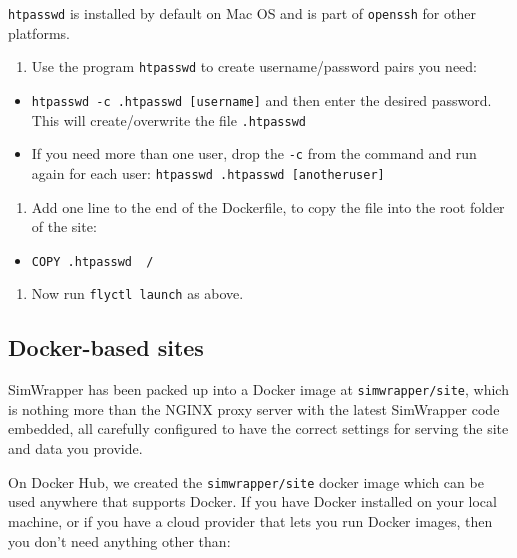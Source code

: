 \texttt{htpasswd} is installed by default on Mac OS and is part of
\texttt{openssh} for other platforms.

\begin{enumerate}
\def\labelenumi{\arabic{enumi}.}
\tightlist
\item
  Use the program \texttt{htpasswd} to create username/password pairs
  you need:
\end{enumerate}

\begin{itemize}
\tightlist
\item
  \texttt{htpasswd\ -c\ .htpasswd\ {[}username{]}} and then enter the
  desired password. This will create/overwrite the file
  \texttt{.htpasswd}
\item
  If you need more than one user, drop the \texttt{-c} from the command
  and run again for each user:
  \texttt{htpasswd\ .htpasswd\ {[}anotheruser{]}}
\end{itemize}

\begin{enumerate}
\def\labelenumi{\arabic{enumi}.}
\setcounter{enumi}{1}
\tightlist
\item
  Add one line to the end of the Dockerfile, to copy the file into the
  root folder of the site:
\end{enumerate}

\begin{itemize}
\tightlist
\item
  \texttt{COPY\ .htpasswd\ \ /}
\end{itemize}

\begin{enumerate}
\def\labelenumi{\arabic{enumi}.}
\setcounter{enumi}{2}
\tightlist
\item
  Now run \texttt{flyctl\ launch} as above.
\end{enumerate}

\hypertarget{docker-based-sites}{%
\subsection{Docker-based sites}\label{docker-based-sites}}

SimWrapper has been packed up into a Docker image at
\texttt{simwrapper/site}, which is nothing more than the NGINX proxy
server with the latest SimWrapper code embedded, all carefully
configured to have the correct settings for serving the site and data
you provide.

On Docker Hub, we created the \texttt{simwrapper/site} docker image
which can be used anywhere that supports Docker. If you have Docker
installed on your local machine, or if you have a cloud provider that
lets you run Docker images, then you don't need anything other than:

